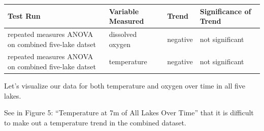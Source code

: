 \documentclass[12pt,]{article}
\begin{document}
\begin{longtable}[]{@{}llll@{}}
\toprule
\begin{minipage}[b]{0.14\columnwidth}\raggedright\strut
Test Run\strut
\end{minipage} & \begin{minipage}[b]{0.22\columnwidth}\raggedright\strut
Variable Measured\strut
\end{minipage} & \begin{minipage}[b]{0.14\columnwidth}\raggedright\strut
Trend\strut
\end{minipage} & \begin{minipage}[b]{0.23\columnwidth}\raggedright\strut
Significance of Trend\strut
\end{minipage}\tabularnewline
\midrule
\endhead
\begin{minipage}[t]{0.14\columnwidth}\raggedright\strut
repeated measures ANOVA on combined five-lake datset\strut
\end{minipage} & \begin{minipage}[t]{0.22\columnwidth}\raggedright\strut
dissolved oxygen\strut
\end{minipage} & \begin{minipage}[t]{0.14\columnwidth}\raggedright\strut
negative\strut
\end{minipage} & \begin{minipage}[t]{0.23\columnwidth}\raggedright\strut
not significant\strut
\end{minipage}\tabularnewline
\begin{minipage}[t]{0.14\columnwidth}\raggedright\strut
repeated measures ANOVA on combined five-lake datset\strut
\end{minipage} & \begin{minipage}[t]{0.22\columnwidth}\raggedright\strut
temperature\strut
\end{minipage} & \begin{minipage}[t]{0.14\columnwidth}\raggedright\strut
negative\strut
\end{minipage} & \begin{minipage}[t]{0.23\columnwidth}\raggedright\strut
not significant\strut
\end{minipage}\tabularnewline
\bottomrule
\end{longtable}

Let's visualize our data for both temperature and oxygen over time in
all five lakes.

See in Figure 5: ``Temperature at 7m of All Lakes Over Time'' that it is
difficult to make out a temperature trend in the combined dataset.
\end{document}
